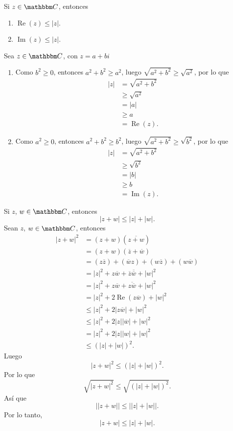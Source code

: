 \begin{proposition}
    Si $z \in \CC$, entonces
    \begin{enumerate}[label=\roman*.]
        \item $\operatorname{Re}(z) \leq |z|$. 
        \item $\operatorname{Im}(z) \leq |z|$.
    \end{enumerate}
    \demostracion Sea $z \in \CC$, con $z=a+bi$
    \begin{enumerate}[label=\roman*.]
        \item Como $b^2 \geq 0$, entonces $a^2+b^2 \geq a^2$, luego $\sqrt{a^2+b^2} \geq \sqrt{a^2}$, por lo que
        \begin{align*}
            |z| &= \sqrt{a^2+b^2} \\
            & \geq \sqrt{a^2} \\
            & =|a| \\
            & \geq a \\
            & =\operatorname{Re}(z).
        \end{align*}
        \item Como $a^2 \geq 0$, entonces $a^2+b^2 \geq b^2$, luego $\sqrt{a^2+b^2} \geq \sqrt{b^2}$, por lo que
        \begin{align*}
            |z| &= \sqrt{a^2+b^2} \\
            & \geq \sqrt{b^2} \\
            & =|b| \\
            & \geq b \\
            & =\operatorname{Im}(z).
        \end{align*}
    \end{enumerate}
\end{proposition}

\begin{theorem}
    Si $z$, $w \in \CC$, entonces
    $$|z+w| \leq |z|+|w|.$$\newpage
    \demostracion Sean $z$, $w \in \CC$, entonces
    \begin{align*}
        |z+w|^2 &=(z+w)\left( \overline{z+w} \right) \\
        &=(z+w)(\overline{z}+ \overline{w}) \\
        &=(z \overline{z})+(\overline{w} z)+(w \overline{z})+(w \overline{w}) \\
        &=|z|^2+z\overline{w}+\overline{z} \overline{\overline{w}}+|w|^2 \\
        &=|z|^2+z \overline{w}+\overline{z\overline{w}}+|w|^2 \\
        &=|z|^2+2  \operatorname{Re}(z \overline{w})+|w|^2 \\
        &\leq |z|^2 +2|z \overline{w}| +|w|^2 \\
        &\leq |z|^2 +2|z||\overline{w}|+|w|^2 \\
        &=|z|^2+2|z||w|+|w|^2 \\
        &\leq (|z|+|w|)^2.
    \end{align*}
    Luego
    $$|z+w|^2 \leq (|z|+|w|)^2.$$
    Por lo que
    $$\sqrt{|z+w|^2} \leq \sqrt{(|z|+|w|)^2}.$$
    Así que
    $$\big| |z+w| \big| \leq \big| |z|+|w| \big|.$$
    Por lo tanto,
    $$|z+w| \leq |z|+|w|.$$
\end{theorem}

